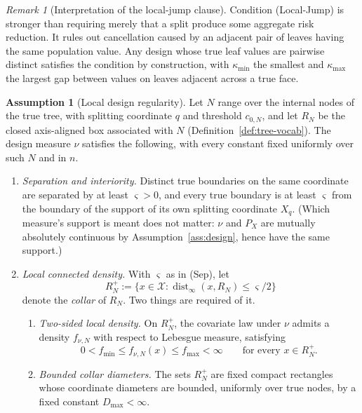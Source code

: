 \documentclass[11pt]{article}
\theoremstyle{plain}
\theoremstyle{definition}
\newtheorem{assumption}{Assumption}
\theoremstyle{remark}
\newtheorem{remark}[theorem]{Remark}
\newcommand{\cX}{\mathcal{X}}
\begin{document}
\begin{remark}[Interpretation of the local-jump clause]
Condition (Local-Jump) is stronger than requiring merely that a split produce
some aggregate risk reduction.  It rules out cancellation caused by an
adjacent pair of leaves having the same population value.  Any design whose
true leaf values are pairwise distinct satisfies the condition by
construction, with \(\kappa_{\min}\) the smallest and \(\kappa_{\max}\) the
largest gap between values on leaves adjacent across a true face.
\end{remark}

\begin{assumption}[Local design regularity]\label{ass:local-design}
Let \(N\) range over the internal nodes of the true tree, with splitting
coordinate \(q\) and threshold \(c_{0,N}\), and let \(R_N\) be the closed
axis-aligned box associated with \(N\) (Definition~\ref{def:tree-vocab}). The
design measure \(\nu\) satisfies the following, with every constant fixed
uniformly over such \(N\) and in \(n\).
\begin{enumerate}[leftmargin=*]
  \item[(Sep)] \emph{Separation and interiority.}
  Distinct true boundaries on the same coordinate are separated by at least
  \(\varsigma>0\), and every true boundary is at least \(\varsigma\) from the
  boundary of the support of its own splitting coordinate \(X_q\). (Which
  measure's support is meant does not matter: \(\nu\) and \(P_X\) are mutually
  absolutely continuous by Assumption~\ref{ass:design}, hence have the same
  support.)

  \item[(Dens)] \emph{Local connected density.} With \(\varsigma\) as in
  (Sep), let
  \[
    R_N^+
    :=
    \bigl\{x\in\cX:
      \operatorname{dist}_\infty(x,R_N)\le\varsigma/2
    \bigr\}
  \]
  denote the \emph{collar} of \(R_N\). Two things are required of it.
  \begin{enumerate}[leftmargin=1.8em]
    \item[(Dens-i)] \emph{Two-sided local density.} On \(R_N^+\), the
    covariate law under \(\nu\) admits a density \(f_{\nu,N}\) with respect to
    Lebesgue measure, satisfying
    \[
      0<f_{\min}
      \le f_{\nu,N}(x)
      \le f_{\max}<\infty
      \qquad\text{for every }x\in R_N^+ .
    \]
    \item[(Dens-ii)] \emph{Bounded collar diameters.} The sets \(R_N^+\) are
    fixed compact rectangles whose coordinate diameters are bounded, uniformly
    over true nodes, by a fixed constant \(D_{\max}<\infty\).
  \end{enumerate}


\end{enumerate}
\end{assumption}
\end{document}

